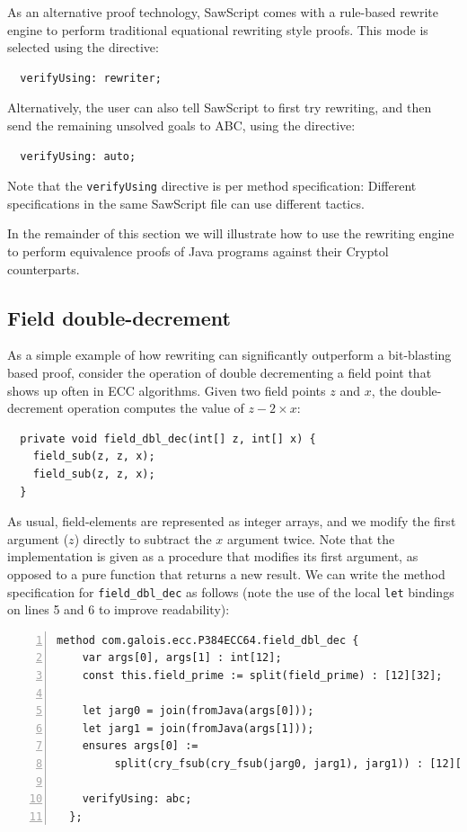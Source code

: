 \documentclass[12pt]{galois-whitepaper}
\newcommand{\sawScript}{{\sc SawScript}\xspace}
\begin{document}
As an alternative proof technology, \sawScript comes with a rule-based rewrite engine to perform
traditional equational rewriting style proofs. This mode is selected using the directive:
\begin{Verbatim}
  verifyUsing: rewriter;
\end{Verbatim}
Alternatively, the user can also tell \sawScript to first try rewriting, and then send the remaining unsolved goals to ABC, using the directive:
\begin{Verbatim}
  verifyUsing: auto;
\end{Verbatim}
Note that the {\tt verifyUsing} directive is per method specification: Different specifications in the same \sawScript file can use different tactics.

In the remainder of this section we will illustrate how to use the rewriting engine to perform equivalence proofs of Java programs against their
Cryptol counterparts.

\subsection{Field double-decrement}\label{sec:doubledec}
As a simple example of how rewriting can significantly outperform a bit-blasting based proof, consider the operation of double decrementing a
field point that shows up often in ECC algorithms.
Given two field points $z$ and $x$, the double-decrement operation computes the value of $z - 2\times x$:
\begin{Verbatim}
  private void field_dbl_dec(int[] z, int[] x) {
    field_sub(z, z, x);
    field_sub(z, z, x);
  }
\end{Verbatim}
As usual, field-elements are represented as integer arrays, and we modify the first argument ($z$) directly to subtract the $x$ argument twice.
Note that the implementation is given as a procedure that modifies its first argument, as opposed to a pure function that returns a new result.
We can write the method specification for {\tt field\_dbl\_dec} as follows (note the use of the local {\tt let} bindings on lines 5 and 6 to improve readability):

\begin{Verbatim}[numbers=left]
  method com.galois.ecc.P384ECC64.field_dbl_dec {
    var args[0], args[1] : int[12];
    const this.field_prime := split(field_prime) : [12][32];
  
    let jarg0 = join(fromJava(args[0]));
    let jarg1 = join(fromJava(args[1]));
    ensures args[0] :=
         split(cry_fsub(cry_fsub(jarg0, jarg1), jarg1)) : [12][32];

    verifyUsing: abc;
  };
\end{Verbatim}
\end{document}
